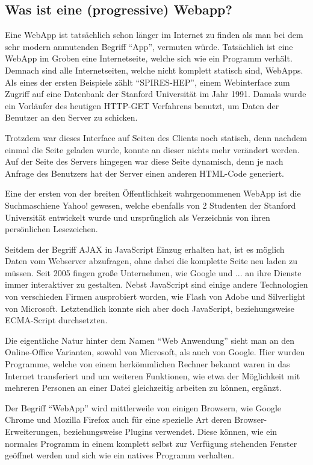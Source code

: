 \documentclass[a4paper,12pt,ngerman,listof=numbered]{scrartcl}      %
\let\oldcite\cite
\renewcommand{\cite}[1]{\textsuperscript{\oldcite{#1}}}
\begin{document}
	\subsection{Was ist eine (progressive) Webapp?}
	Eine WebApp ist tatsächlich schon länger im Internet zu finden als man bei dem sehr modern anmutenden Begriff ``App'', vermuten würde. Tatsächlich ist eine WebApp im Groben eine Internetseite, welche sich wie ein Programm verhält. Demnach sind alle Internetseiten, welche nicht komplett statisch sind, WebApps. Als eines der ersten Beispiele zählt ``SPIRES-HEP'', einem Webinterface zum Zugriff auf eine Datenbank der Stanford Universität im Jahr 1991. Damals wurde ein Vorläufer des heutigen HTTP-GET Verfahrens benutzt, um Daten der Benutzer an den Server zu schicken.\par
	Trotzdem war dieses Interface auf Seiten des Clients noch statisch, denn nachdem einmal die Seite geladen wurde, konnte an dieser nichts mehr verändert werden. Auf der Seite des Servers hingegen war diese Seite dynamisch, denn je nach Anfrage des Benutzers hat der Server einen anderen HTML-Code generiert.\par
	Eine der ersten von der breiten Öffentlichkeit wahrgenommenen WebApp ist die Suchmaschiene Yahoo! gewesen, welche ebenfalls von 2 Studenten der Stanford Universität entwickelt wurde und ursprünglich als Verzeichnis von ihren persönlichen Lesezeichen.\cite{webappWiki}\par
	Seitdem der Begriff AJAX in JavaScript Einzug erhalten hat, ist es möglich Daten vom Webserver abzufragen, ohne dabei die komplette Seite neu laden zu müssen. Seit 2005 fingen große Unternehmen, wie Google und ... an ihre Dienste immer interaktiver zu gestalten. Nebst JavaScript sind einige andere Technologien von verschieden Firmen ausprobiert worden, wie Flash von Adobe und Silverlight von Microsoft. Letztendlich konnte sich aber doch JavaScript, beziehungsweise ECMA-Script durchsetzten.\cite{webappWikiEN}\par
	Die eigentliche Natur hinter dem Namen ``Web Anwendung'' sieht man an den Online-Office Varianten, sowohl von Microsoft, als auch von Google. Hier wurden Programme, welche von einem herkömmlichen Rechner bekannt waren in das Internet transferiert und um weiteren Funktionen, wie etwa der Möglichkeit mit mehreren Personen an einer Datei gleichzeitig arbeiten zu können, ergänzt.\par
	Der Begriff ``WebApp'' wird mittlerweile von einigen Browsern, wie Google Chrome und Mozilla Firefox auch für eine spezielle Art deren Browser-Erweiterungen, beziehungsweise Plugins verwendet. Diese können, wie ein normales Programm in einem komplett selbst zur Verfügung stehenden Fenster geöffnet werden und sich wie ein natives Programm verhalten.\cite{chromeWebStore}\par
\end{document}

